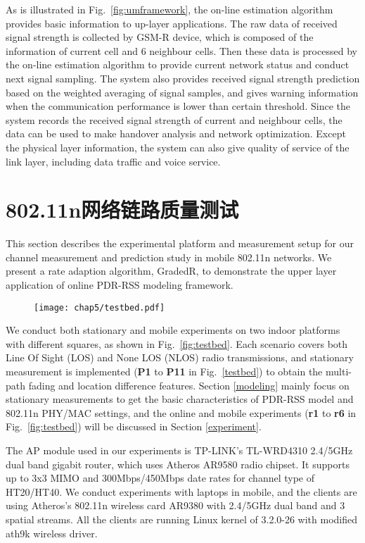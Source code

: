 As is illustrated in Fig.~\ref{fig:umframework}, the on-line estimation algorithm provides basic information to up-layer applications. The raw data of received signal strength is collected by GSM-R device, which is composed of the information of current cell and 6 neighbour cells. Then these data is processed by the on-line estimation algorithm to provide current network status and conduct next signal sampling. The system also provides received signal strength prediction based on the weighted averaging of signal samples, and gives warning information when the communication performance is lower than certain threshold. Since the system records the received signal strength of current and neighbour cells, the data can be used to make handover analysis and network optimization. Except the physical layer information, the system can also give quality of service of the link layer, including data traffic and voice service.

\section{802.11n网络链路质量测试}
\label{sec:80211n} 

This section describes the experimental platform and measurement setup for our channel measurement and prediction study in mobile 802.11n networks. We present a rate adaption algorithm, GradedR, to demonstrate the upper layer application of online PDR-RSS modeling framework.

\begin{figure}[!htp]
\centering
\texttt{[image: chap5/testbed.pdf]}
\end{figure}

We conduct both stationary and mobile experiments on two indoor platforms with different squares, as shown in Fig.~\ref{fig:testbed}. Each scenario covers both Line Of Sight (LOS) and None LOS (NLOS) radio transmissions, and stationary measurement is implemented (\textbf{P1} to \textbf{P11} in Fig.~\ref{testbed}) to obtain the multi-path fading and location difference features. Section \ref{modeling} mainly focus on stationary measurements to get the basic characteristics of PDR-RSS model and 802.11n PHY/MAC settings, and the online and mobile experiments (\textbf{r1} to \textbf{r6} in Fig.~\ref{fig:testbed}) will be discussed in Section \ref{experiment}.

The AP module used in our experiments is TP-LINK's TL-WRD4310 2.4/5GHz dual band gigabit router, which uses Atheros AR9580 radio chipset. It supports up to 3x3 MIMO and 300Mbps/450Mbps date rates for channel type of HT20/HT40. We conduct experiments with laptops in mobile, and the clients are using Atheros's 802.11n wireless card AR9380 with 2.4/5GHz dual band and 3 spatial streams. All the clients are running Linux kernel of 3.2.0-26 with modified ath9k wireless driver.

